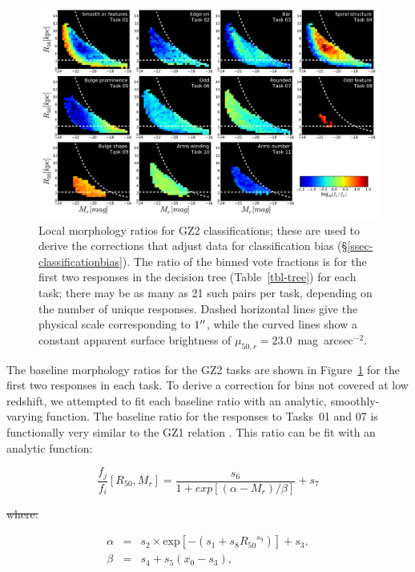\documentclass[useAMS,usenatbib]{mn2e}
\providecommand{\DIFaddtex}[1]{{\protect\color{blue}\uwave{#1}}} %
\providecommand{\DIFdeltex}[1]{{\protect\color{red}\sout{#1}}}                      %
\providecommand{\DIFaddbegin}{} %
\providecommand{\DIFaddend}{} %
\providecommand{\DIFdelbegin}{} %
\providecommand{\DIFdelend}{} %
\providecommand{\DIFadd}[1]{\texorpdfstring{\DIFaddtex{#1}}{#1}} %
\providecommand{\DIFdel}[1]{\texorpdfstring{\DIFdeltex{#1}}{}} %
\begin{document}
\begin{figure}
\includegraphics[angle=0,width=7.0in]{figures/gz2_baselines.pdf}
\caption{Local morphology ratios for GZ2 classifications; these are used to derive the corrections that adjust data for classification bias (\S\ref{ssec-classificationbias}). The ratio of the binned vote fractions is for the first two responses in the decision tree (Table~\ref{tbl-tree}) for each task; there may be as many as 21 such pairs per task, depending on the number of unique responses. Dashed horizontal lines give the physical scale corresponding to $1\hbox{$^{\prime\prime}$}$, while the curved lines show a constant apparent surface brightness of $\mu_{50,r}=23.0$~mag~arcsec$^{-2}$.
\label{fig-baselines}}
\end{figure}

The baseline morphology ratios for the GZ2 tasks are shown in Figure~\ref{fig-baselines} for the first two responses in each task. To derive a correction for bins not covered at low redshift, we attempted to fit each baseline ratio with an analytic, smoothly-varying function. The baseline ratio for the responses to Tasks~01 and 07 is functionally very similar to the GZ1 relation \citep[Figure~A5 in][]{bam09}. This ratio can be fit with an analytic function: 
\DIFdelbegin %

\DIFdelend \begin{equation}
\frac{f_j}{f_i}[R_{50},M_r] = \frac{s_6}{1 + exp[(\alpha - M_r)/\beta]} + s_7
\label{eqn-sb}
\end{equation}
\DIFdelbegin %

\DIFdel{where:
}%

\DIFdelend \DIFaddbegin \DIFadd{where:
}\DIFaddend \begin{eqnarray}
\alpha &=& s_2\times\text{exp}[{-\left(s_1 + s_8{R_{50}}^{s_9}\right)}] + s_3, \\
\beta  &=& s_4 + s_5(x_0 - s_3),
\end{eqnarray}
\DIFdelbegin %
\end{document}
